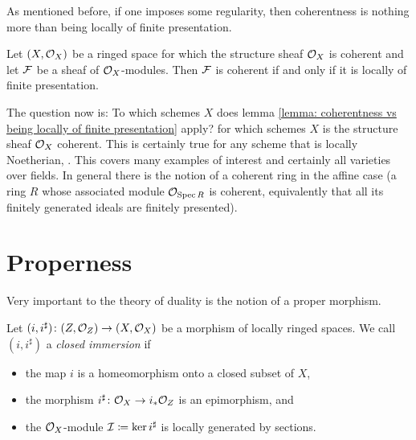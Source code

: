 As mentioned before, if one imposes some regularity, then coherentness is nothing more than being locally of finite presentation.
\begin{lemma}
	\label{lemma: coherentness vs being locally of finite presentation}
	
	Let $(X, {{\mathcal{O}}_{X}})$ be a ringed space for which the structure sheaf ${{\mathcal{O}}_{X}}$ is coherent and let ${\mathcal{F}}$ be a sheaf of ${{\mathcal{O}}_{X}}$-modules. Then ${\mathcal{F}}$ is coherent if and only if it is locally of finite presentation.
\end{lemma}

\begin{remark}
	The question now is: To which schemes $X$ does lemma \ref{lemma: coherentness vs being locally of finite presentation} apply? \Ie for which schemes $X$ is the structure sheaf ${{\mathcal{O}}_{X}}$ coherent. This is certainly true for any scheme that is locally Noetherian, \confer \cite[\href{https://stacks.math.columbia.edu/tag/01XZ}{Tag 01XZ}]{stacks-project}. This covers many examples of interest and certainly all varieties over fields. In general there is the notion of a coherent ring in the affine case (a ring $R$ whose associated module ${{\mathcal{O}}_{\operatorname{Spec} R}}$ is coherent, equivalently that all its finitely generated ideals are finitely presented).
\end{remark}

\section{Properness}
\label{section: properness}

Very important to the theory of duality is the notion of a proper morphism.

\begin{definition}
	
	Let $(i, i^\sharp)\colon (Z,{{\mathcal{O}}_{Z}})\to (X,{{\mathcal{O}}_{X}})$ be a morphism of locally ringed spaces. We call $(i, i^\sharp)$ a \emph{closed immersion} if
	\begin{itemize}
		\item
		the map $i$ is a homeomorphism onto a closed subset of $X$,
		
		\item
		the morphism $i^\sharp\colon{{\mathcal{O}}_{X}}\to i_\ast {{\mathcal{O}}_{Z}}$ is an epimorphism, and
		
		\item 
		the ${{\mathcal{O}}_{X}}$-module ${\mathcal{I}}\coloneqq \ker i^\sharp$ is locally generated by sections.  
	\end{itemize}
\end{definition}

